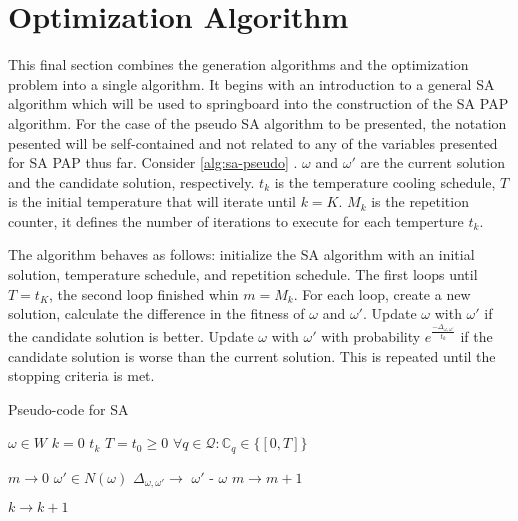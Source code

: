 \documentclass[11pt,a4paper,final]{article}
\newcommand{\C}{\mathbb{C}}                 %
\newcommand{\Qset}{\mathcal{Q}}             %
\begin{document}
\section{Optimization Algorithm}
\label{optimization-algorithm}
This final section combines the generation algorithms and the optimization problem into a single algorithm. It begins
with an introduction to a general SA algorithm which will be used to springboard into the construction of the SA PAP
algorithm. For the case of the pseudo SA algorithm to be presented, the notation pesented will be self-contained and not
related to any of the variables presented for SA PAP thus far. Consider \ref{alg:sa-pseudo} \cite{henderson-1989-theor-pract}.
\(\omega\) and \(\omega'\) are the current solution and the candidate solution, respectively. \(t_k\) is the temperature cooling
schedule, \(T\) is the initial temperature that will iterate until \(k = K\). \(M_k\) is the repetition counter, it defines
the number of iterations to execute for each temperture \(t_k\).

The algorithm behaves as follows: initialize the SA algorithm with an initial solution, temperature schedule, and
repetition schedule. The first loops until \(T = t_K\), the second loop finished whin \(m = M_k\). For each loop, create a
new solution, calculate the difference in the fitness of \(\omega\) and \(\omega'\). Update \(\omega\) with \(\omega'\) if the candidate solution is
better. Update \(\omega\) with \(\omega'\) with probability \(e^{\frac{-\Delta_{\omega , \omega'}}{t_k}}\) if the candidate solution is worse than the
current solution. This is repeated until the stopping criteria is met.

\begin{algorithm}[H]
\caption{Pseudo-code for SA} \label{alg:sa-pseudo}
    \LinesNumbered

    \Begin
    {
        $\omega \in W$ 
        $k=0$ 
        $t_k$ 
        $T = t_0 \geq 0$ 
        $\forall q \in \Qset : \C_q \in \{[0,T]\}$ 

        {
            $m \rightarrow 0$ 
            {
                $\omega' \in N(\omega)$ 
                $\Delta_{\omega,\omega'} \rightarrow$ \f{$\omega'$} - \f{$\omega$} 
                $m \rightarrow m+1$\;
            }

        $k \rightarrow k+1$\;
        }
    }
\end{algorithm}
\end{document}
